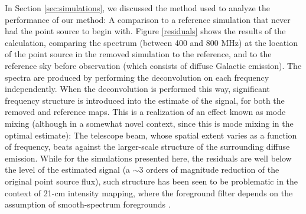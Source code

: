 In Section \ref{sec:simulations}, we discussed the method used to analyze the performance of our method: A comparison to a reference simulation that never had the point source to begin with. Figure \ref{residuals} shows the results of the calculation, comparing the spectrum (between 400 and 800 MHz) at the location of the point source in the removed simulation to the reference, and to the reference sky before observation (which consists of diffuse Galactic emission). The spectra are produced by performing the deconvolution on each frequency independently. When the deconvolution is performed this way, significant frequency structure is introduced into the estimate of the signal, for both the removed and reference maps. This is a realization of an effect known as mode mixing (although in a somewhat novel context, since this is mode mixing in the optimal estimate): The telescope beam, whose spatial extent varies as a function of frequency, beats against the larger-scale structure of the surrounding diffuse emission. While for the simulations presented here, the residuals are well below the level of the estimated signal (a $\sim 3$ orders of magnitude reduction of the original point source flux), such structure has been seen to be problematic in the context of 21-cm intensity mapping, where the foreground filter depends on the assumption of smooth-spectrum foregrounds \citep{barry2016}.

